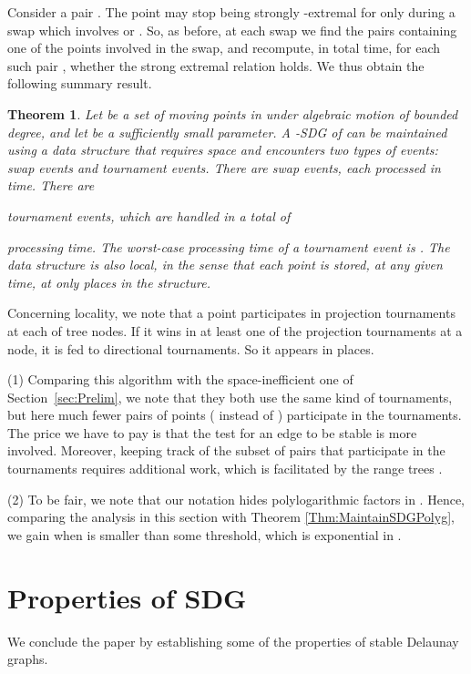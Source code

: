 \documentclass[letter,11pt]{article}
\newtheorem{theorem}{Theorem}[section]
\begin{document}
Consider a pair . The point  may stop being
strongly
-extremal for  only during a swap which involves  
or . So, as before, at each swap we find the  pairs
containing one of the points involved in the swap, and recompute, in 
total time,
for each such pair , whether
the strong extremal relation holds. 
 We thus obtain the following summary result.

\begin{theorem}\label{Thm:ReducedS}
Let  be a set of  moving points in  under algebraic
motion of bounded degree, 
and let  be a sufficiently small parameter. A -SDG of 
can be maintained using a data structure that requires 
 space and encounters two types of
events: swap events 
and tournament events.  There are  swap events, 
each processed in  time.
There are

 tournament 
events, which are handled in a total of 

processing time. The worst-case processing time of a
tournament event is . The data structure is also {\it local}, in the sense that each point
is stored, at any given time, at only  places in the structure.
\end{theorem}
Concerning locality, we note that a point participates in  projection tournaments at each of  tree nodes. If it wins in at least one of the projection tournaments at a node, it is fed to  
directional tournaments. So it appears in  places.

 (1) Comparing this algorithm with the space-inefficient one of Section~\ref{sec:Prelim}, we note that they both use the 
same kind of tournaments, but here much fewer pairs of points 
( instead of ) participate in the 
tournaments. The price we have to pay is that the test for an edge 
to be stable is more involved. Moreover, keeping track of the subset of 
pairs that participate in the tournaments requires additional work,
which is facilitated by the range trees .

\medskip\noindent
(2) To be fair, we note that our  notation hides polylogarithmic factors in . Hence, comparing the analysis in this section with Theorem \ref{Thm:MaintainSDGPolyg}, we gain when  is smaller than some threshold, which is exponential in .
\section{Properties of  SDG}\label{Sec:SDGProperties}
We conclude the paper by establishing some of the properties of stable Delaunay graphs. 
\end{document}
